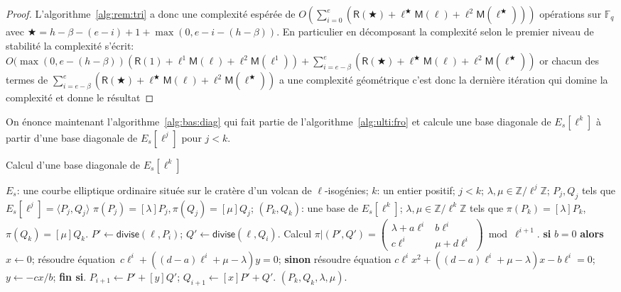 \documentclass[10pt,a4paper]{book}
\theoremstyle{plain}
\theoremstyle{definition}
\theoremstyle{definition}
\theoremstyle{definition}
\theoremstyle{definition}
\theoremstyle{remark}
\theoremstyle{remark}
\theoremstyle{definition}
\begin{document}
\begin{proof}
L'algorithme~\ref{alg:rem:tri} a donc une complexité espérée de 
$O(\sum_{i=0}^{e}(\mathsf{R}(\bigstar)+
\ell^{\bigstar}\mathsf{M}(\ell)+\ell^2 \mathsf{M}
(\ell^{\bigstar})))$ 
opérations sur $\mathbb{F}_q$ avec $\bigstar=h-\beta-(e-i)+1+\max(0,e-i-(h-\beta))$. 
En particulier en décomposant la complexité selon le premier niveau de 
stabilité la complexité s'écrit:
$
O(\max(0,e-(h-\beta))(\mathsf{R}(1)+
\ell^{1}\mathsf{M}(\ell)+\ell^2 \mathsf{M}(\ell^{1}))+
\sum_{i=e-\beta}^e(\mathsf{R}(\bigstar)+
\ell^{\bigstar}\mathsf{M}(\ell)+\ell^2 \mathsf{M}
(\ell^{\bigstar}))
$
or chacun des termes de $\sum_{i=e-\beta}^e(\mathsf{R}(\bigstar)+
\ell^{\bigstar}\mathsf{M}(\ell)+\ell^2 \mathsf{M}
(\ell^{\bigstar}))$ a une complexité géométrique c'est donc la dernière 
itération qui domine la complexité et donne le résultat
\end{proof}

On énonce maintenant l'algorithme~\ref{alg:bas:diag} qui fait partie de 
l'algorithme~\ref{alg:ulti:fro} et calcule une base diagonale de $E_s[\ell^k]$ à
partir d'une base diagonale de $E_s[\ell^j]$ pour $j<k$.

\begin{algorithm}
\caption{\label{alg:bas:diag}Calcul d'une base diagonale de $E_s[\ell^k]$}
\begin{algorithmic}[1]
\REQUIRE $E_s$: une courbe elliptique ordinaire située sur le cratère d'un volcan de $\ell$-isogénies; $k$: un entier positif; $j<k$; $\lambda, \mu \in \mathbb{Z}/\ell^{j}\mathbb{Z}$; $P_j,Q_j$ tels que $E_s[\ell^j]=\langle P_j,Q_j \rangle$ $\pi(P_j)=[\lambda] P_j, \pi(Q_j)=[\mu]Q_j$;
\ENSURE $(P_k, Q_k )$: une base de $E_s[\ell^k]$;
$\lambda, \mu \in \mathbb{Z}/\ell^k \mathbb{Z}$
tels que $\pi(P_k)= [\lambda] P_k$, $ \pi(Q_k)= [\mu] Q_k$.
\STATE\label{alg:diagonal:divide}
  $P' \leftarrow \mathsf{divise}(\ell, P_{i})$; $Q' \leftarrow \mathsf{divise} (\ell, Q_{i})$.
\STATE\label{alg:diagonal:frobenius}
  Calcul $\pi|(P',Q')=\left( \begin{smallmatrix}
\lambda + a\ell^{i} & b\ell^{i}\\
c\ell^{i} & \mu + d\ell^{i} \end{smallmatrix} \right) \bmod {\ell^{i+1}}.$
\STATE\label{alg:diagonal:solve1}
  \textbf{si} $b = 0$ \textbf{alors} $x \leftarrow 0$;
  résoudre équation~$c \ell^{i} + ((d-a) \ell^{i} + \mu-\lambda) y = 0$;
\STATE\label{alg:diagonal:solve2}
  \textbf{sinon} résoudre équation
  $c \ell^{i} x^2 + ((d-a) \ell^{i}+ \mu-\lambda) x - b \ell^{i} = 0$;
  $y \leftarrow -cx/b$; \textbf{fin si}.
\STATE\label{alg:diagonal:upd-P}
  $P_{i+1} \leftarrow P' + [y] Q'$; $Q_{i+1} \leftarrow [x] P' + Q'$.
\ENDFOR
\RETURN $(P_{k},Q_{k},\lambda,\mu).$
\end{algorithmic}
\end{algorithm}
\end{document}
